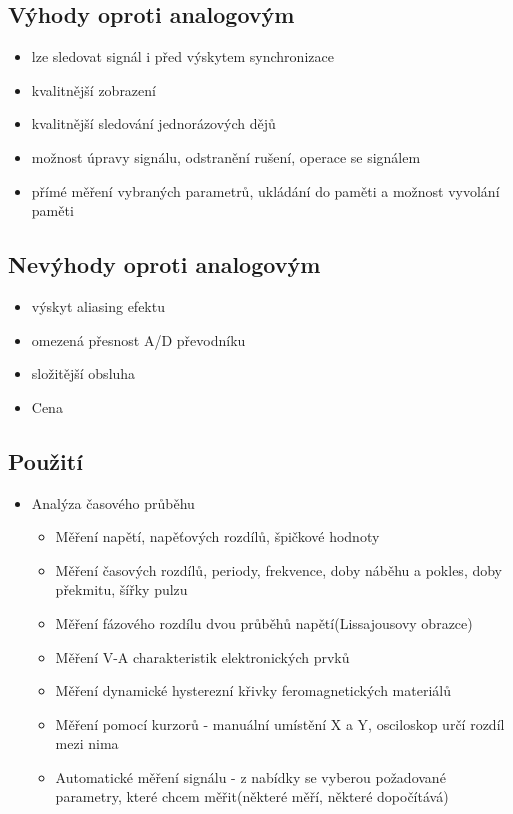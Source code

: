 \subsection*{Výhody oproti analogovým}
\begin{itemize}
    \item lze sledovat signál i před výskytem synchronizace
    \item kvalitnější zobrazení
    \item kvalitnější sledování jednorázových dějů
    \item možnost úpravy signálu, odstranění rušení, operace se signálem
    \item přímé měření vybraných parametrů, ukládání do paměti a možnost vyvolání paměti
\end{itemize}

\subsection*{Nevýhody oproti analogovým}
\begin{itemize}
    \item výskyt aliasing efektu
    \item omezená přesnost A/D převodníku
    \item složitější obsluha
    \item Cena
\end{itemize}

\subsection*{Použití}
\begin{itemize}
    \item Analýza časového průběhu
          \begin{itemize}
              \item Měření napětí, napěťových rozdílů, špičkové hodnoty
              \item Měření časových rozdílů, periody, frekvence, doby náběhu a pokles, doby
                    překmitu, šířky pulzu
              \item Měření fázového rozdílu dvou průběhů napětí(Lissajousovy obrazce)
              \item Měření V-A charakteristik elektronických prvků
              \item Měření dynamické hysterezní křivky feromagnetických materiálů
              \item Měření pomocí kurzorů - manuální umístění X a Y, osciloskop určí rozdíl mezi
                    nima
              \item Automatické měření signálu - z nabídky se vyberou požadované parametry, které
                    chcem měřit(některé měří, některé dopočítává)
          \end{itemize}
\end{itemize}


